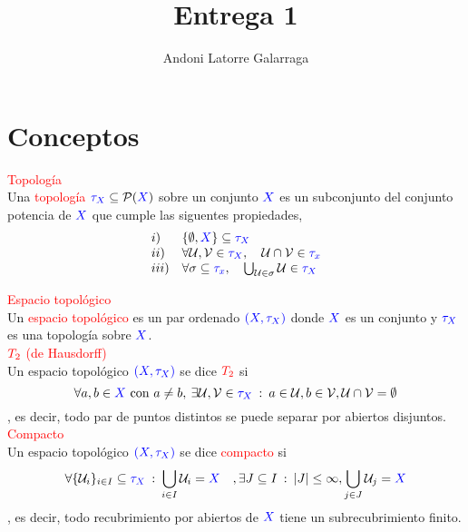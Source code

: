 \documentclass{article}
\title{Entrega 1}
\author{Andoni Latorre Galarraga}
\date{}
\begin{document}
\maketitle

\section*{\textcolor{WildStrawberry}{Conceptos}}

\textcolor{red}{Topología}\\
Una \textcolor{red}{topología} $\textcolor{blue}{\tau_X}\subseteq \mathcal{P}(\textcolor{blue}{X})$ sobre un conjunto $\textcolor{blue}{X}$ es un subconjunto del conjunto potencia de $\textcolor{blue}{X}$ que cumple las siguentes propiedades,
$$
\begin{array}{ll}
    i) & \{\emptyset, \textcolor{blue}{X}\}\subseteq \textcolor{blue}{\tau_X} \\
    ii) & \forall\mathcal{U},\mathcal{V}\in \textcolor{blue}{\tau_X}, \quad \mathcal{U}\cap\mathcal{V}\in \textcolor{blue}{\tau_x} \\
    iii) & \forall \sigma \subseteq \textcolor{blue}{\tau_x}, \quad \bigcup_{\mathcal{U}\in \sigma} \mathcal{U} \in \textcolor{blue}{\tau_X}
\end{array}
$$

\textcolor{red}{Espacio topológico}\\
Un \textcolor{red}{espacio topológico} es un par ordenado $\textcolor{blue}{(X,\tau_X)}$ donde $\textcolor{blue}{X}$ es un conjunto y $\textcolor{blue}{\tau_X}$ es una topología sobre $\textcolor{blue}{X}$.\\

$\textcolor{red}{T_2}$ \textcolor{red}{(de Hausdorff)}\\
Un espacio topológico $\textcolor{blue}{(X,\tau_X)}$ se dice $\textcolor{red}{T_2}$ si
$$
\forall a,b\in \textcolor{blue}{X} \text{ con } a \ne b, \: \exists \mathcal{U},\mathcal{V}\in \textcolor{blue}{\tau_X} \: : \: a\in\mathcal{U}, b\in\mathcal{V}, \mathcal{U}\cap\mathcal{V}=\emptyset
$$
, es decir, todo par de puntos distintos se puede separar por abiertos disjuntos.\\

\textcolor{red}{Compacto}\\
Un espacio topológico $\textcolor{blue}{(X,\tau_X)}$ se dice \textcolor{red}{compacto} si
$$
\forall \{\mathcal{U}_i\}_{i\in I} \subseteq \textcolor{blue}{\tau_X}\: :\: \bigcup_{i\in I} \mathcal{U}_i = \textcolor{blue}{X} \quad, \exists J\subseteq I \: :\: |J|\le\infty, \bigcup_{j\in J} \mathcal{U}_j = \textcolor{blue}{X}
$$
, es decir, todo recubrimiento por abiertos de $\textcolor{blue}{X}$ tiene un subrecubrimiento finito.\\
\end{document}
